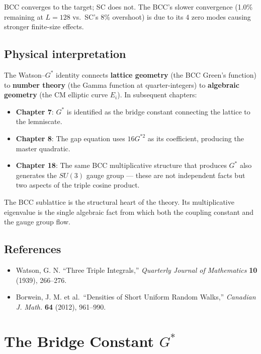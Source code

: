 \documentclass[
  11pt,
  letterpaper,
  twoside,
  openany]{book}
\makeatletter
\providecommand{\tightlist}{%
  \setlength{\itemsep}{0pt}\setlength{\parskip}{0pt}}
\let\orig@section\section
\renewcommand{\section}{\needspace{8\baselineskip}\orig@section}
\newcommand{\Gs}{G^{*}{}}
\newcommand{\Gssq}{G^{*2}{}}      %
\makeatother
\begin{document}
BCC converges to the target; SC does not. The BCC's slower convergence
(1.0\% remaining at \(L = 128\) vs.~SC's 8\% overshoot) is due to its 4
zero modes causing stronger finite-size effects.

\section{Physical interpretation}\label{physical-interpretation}

The Watson--\(\Gs\) identity connects \textbf{lattice geometry} (the BCC
Green's function) to \textbf{number theory} (the Gamma function at
quarter-integers) to \textbf{algebraic geometry} (the CM elliptic curve
\(E_i\)). In subsequent chapters:

\begin{itemize}
\tightlist
\item
  \textbf{Chapter 7}: \(\Gs\) is identified as the bridge constant
  connecting the lattice to the lemniscate.
\item
  \textbf{Chapter 8}: The gap equation uses \(16 \Gssq\) as its
  coefficient, producing the master quadratic.
\item
  \textbf{Chapter 18}: The same BCC multiplicative structure that
  produces \(\Gs\) also generates the \(SU(3)\) gauge group --- these
  are not independent facts but two aspects of the triple cosine
  product.
\end{itemize}

The BCC sublattice is the structural heart of the theory. Its
multiplicative eigenvalue is the single algebraic fact from which both
the coupling constant and the gauge group flow.

\section{References}\label{references}

\begin{itemize}
\tightlist
\item
  Watson, G. N. ``Three Triple Integrals,'' \emph{Quarterly Journal of
  Mathematics} \textbf{10} (1939), 266--276.
\item
  Borwein, J. M. et al.~``Densities of Short Uniform Random Walks,''
  \emph{Canadian J. Math.} \textbf{64} (2012), 961--990.
\end{itemize}

\chapter{\texorpdfstring{The Bridge Constant
\(\Gs\)}{The Bridge Constant \textbackslash Gs}}\label{sec-gstar}
\end{document}
